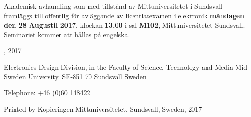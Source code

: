 \thispagestyle{empty}

{\raggedright
Akademisk avhandling som med tillstånd av Mittuniversitetet i Sundsvall framläggs till offentlig för avläggande av licentiatexamen i elektronik \textbf{måndagen den 28 Augustil 2017}, klockan \textbf{13.00} i sal \textbf{M102}, Mittuniversitetet Sundsvall. Seminariet kommer att hållas på engelska.

\vfill

{\large\thetitle}

\vspace{1cm}

\theauthor

\vspace{1cm}

\textcopyright \theauthor, 2017
\vspace{1cm}

Electronics Design Division, in the
Faculty of Science, Technology and Media
Mid Sweden University, SE-851 70 Sundsvall
Sweden

\vspace{1cm}

Telephone: +46 (0)60 148422

\vspace{1cm}

Printed by Kopieringen Mittuniversitetet, Sundsvall, Sweden, 2017
}